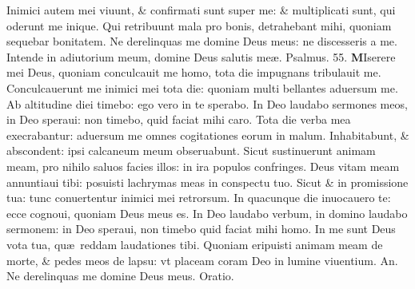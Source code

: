 \documentclass[a5paper,10pt]{book}
\def\ae{æ}
\begin{document}
\begin{multicols*}{2}
\newline \color{red} I\color{black}nimici autem mei viuunt, \& confirmati sunt super me: \& multiplicati sunt, qui oderunt me inique.
\newline \color{red} Q\color{black}ui retribuunt mala pro bonis, detrahebant mihi, quoniam sequebar bonitatem.
\newline \color{red} N\color{black}e derelinquas me domine Deus meus: ne discesseris a me.
\newline \color{red} I\color{black}ntende in adiutorium meum, domine Deus salutis me\ae . \quad \color{red} Psalmus. \hypertarget{ps55}{55.} \color{black}
\vspace{-.5em}
\lettrine[lines=2]{\bfseries \color{red} M}{}Iserere mei Deus, quoniam conculcauit me homo, tota die impugnans tribulauit me.
\newline \color{red} C\color{black}onculcauerunt me inimici mei tota die: quoniam multi bellantes aduersum me.
\newline \color{red} A\color{black}b altitudine diei timebo: ego vero in te sperabo.
\newline \color{red} I\color{black}n Deo laudabo sermones meos, in Deo speraui: non timebo, quid faciat mihi caro.
\newline \color{red} T\color{black}ota die verba mea execrabantur: aduersum me omnes cogitationes eorum in malum.
\newline \color{red} I\color{black}nhabitabunt, \& abscondent: ipsi calcaneum meum obseruabunt.
\newline \color{red} S\color{black}icut sustinuerunt animam meam, pro nihilo saluos facies illos: in ira populos confringes.
\newline \color{red} D\color{black}eus vitam meam annuntiaui tibi: posuisti lachrymas meas in conspectu tuo.
\newline \color{red} S\color{black}icut \& in promissione tua: tunc conuertentur inimici mei retrorsum.
\newline \color{red} I\color{black}n quacunque die inuocauero te: ecce cognoui, quoniam Deus meus es.
\newline \color{red} I\color{black}n Deo laudabo verbum, in domino laudabo sermonem: in Deo speraui, non timebo quid faciat mihi homo.
\newline \color{red} I\color{black}n me sunt Deus vota tua, qu\ae \ reddam laudationes tibi.
\newline \color{red} Q\color{black}uoniam eripuisti animam meam de morte, \& pedes meos de lapsu: vt placeam coram Deo in lumine viuentium. \color{red} An. \color{black} Ne derelinquas me domine Deus meus. \color{red} Oratio. \color{black}

\end{multicols*}
\end{document}
